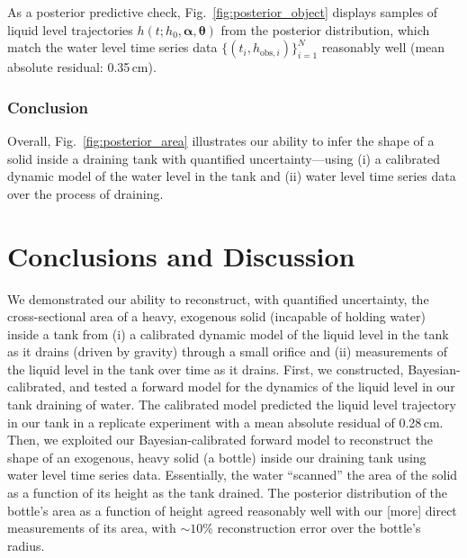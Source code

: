 \documentclass[a4paper,fleqn]{cas-dc}
\newcommand\thedata {$\{(t_i,h_{\text{obs}, i})\}_{i=1}^{N}$\xspace}
\newcommand\themodel {$h(t; h_0, \boldsymbol \alpha, \boldsymbol\theta)$\xspace}
\begin{document}
As a posterior predictive check, Fig.~\ref{fig:posterior_object} displays samples of liquid level trajectories \themodel from the posterior distribution, which match the water level time series data \thedata reasonably well (mean absolute residual: 0.35\,cm). 

\subsubsection{Conclusion} Overall, Fig.~\ref{fig:posterior_area} illustrates our ability to infer the shape of a solid inside a draining tank with quantified uncertainty---using (i) a calibrated dynamic model of the water level in the tank and (ii) water level time series data over the process of draining. %


\section{Conclusions and Discussion}
We demonstrated our ability to reconstruct, with quantified uncertainty, the cross-sectional area of a heavy, exogenous solid (incapable of holding water) inside a tank from (i) a calibrated dynamic model of the liquid level in the tank as it drains (driven by gravity) through a small orifice and (ii) measurements of the liquid level in the tank over time as it drains.
First, we constructed, Bayesian-calibrated, and tested a forward model for the dynamics of the liquid level in our tank draining of water.
The calibrated model predicted the liquid level trajectory in our tank in a replicate experiment with a mean absolute residual of 0.28\,cm.
Then, we exploited our Bayesian-calibrated forward model to reconstruct the shape of an exogenous, heavy solid (a bottle) inside our draining tank using water level time series data. 
Essentially, the water ``scanned'' the area of the solid as a function of its height as the tank drained. 
The posterior distribution of the bottle's area as a function of height agreed reasonably well with our [more] direct measurements of its area, with $\sim 10$\% reconstruction error over the bottle's radius. 
\end{document}
